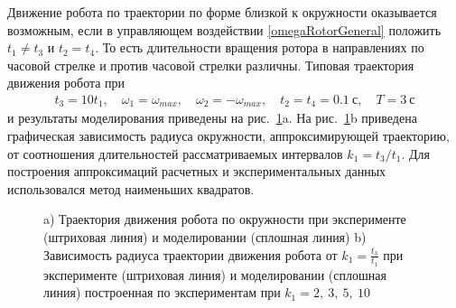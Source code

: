 Движение робота по траектории по форме близкой к окружности оказывается возможным, если в управляющем воздействии \eqref{omegaRotorGeneral} положить $t_1 \neq t_3$ и $t_2 = t_4$. То есть длительности вращения ротора в направлениях по часовой стрелке и против часовой стрелки различны. Типовая траектория движения робота при
\begin{gather}
t_3 = 10 t_1,\quad \omega_1 = \omega_{max},\quad \omega_2 = -\omega_{max},\quad t_2 = t_4 = 0.1~\text{с},\quad T = 3~\text{с}
\end{gather}
и результаты моделирования приведены на рис.~\ref{CircleTrajectory}a. На рис.~\ref{CircleTrajectory}b приведена графическая зависимость радиуса окружности, аппроксимирующей траекторию, от соотношения длительностей рассматриваемых интервалов $k_1 = t_3 / t_1$. Для построения аппроксимаций расчетных и экспериментальных данных использовался метод наименьших квадратов.


\begin{figure}[!ht]
	\begin{minipage}[h]{0.3\linewidth}
	\end{minipage}
	\hfill
	\begin{minipage}[h]{0.7\linewidth}
	\end{minipage}
	\caption{a) Траектория движения робота по окружности при эксперименте (штриховая линия) и моделировании (сплошная линия)  b) Зависимость радиуса траектории движения робота от $k_1 = \frac{t_3}{t_1}$ при эксперименте (штриховая линия) и моделировании (сплошная линия) построенная по экспериментам при $k_1 = 2,\ 3,\ 5,\ 10$ }
	\label{CircleTrajectory}
\end{figure}

